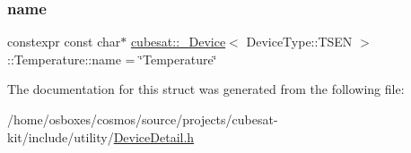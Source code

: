 \subsubsection{\texorpdfstring{name}{name}}
{\footnotesize\ttfamily constexpr const char$\ast$ \hyperlink{structcubesat_1_1__Device}{cubesat\+::\+\_\+\+Device}$<$ Device\+Type\+::\+T\+S\+EN $>$\+::Temperature\+::name = \char`\"{}Temperature\char`\"{}\hspace{0.3cm}{\ttfamily [static]}}



The documentation for this struct was generated from the following file\+:\begin{DoxyCompactItemize}
\item 
/home/osboxes/cosmos/source/projects/cubesat-\/kit/include/utility/\hyperlink{DeviceDetail_8h}{Device\+Detail.\+h}\end{DoxyCompactItemize}
